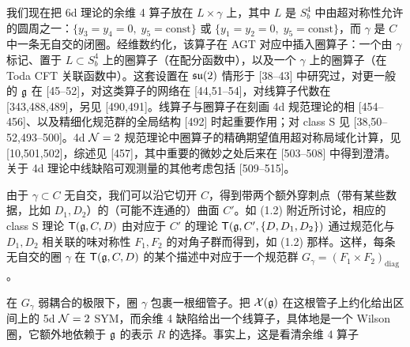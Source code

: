 我们现在把 6d 理论的余维 4 算子放在 $L\times\gamma$ 上，其中 $L$ 是 $S^4_b$ 中由超对称性允许的圆周之一：$\{y_3=y_4=0,\;y_5=\mathrm{const}\}$ 或 $\{y_1=y_2=0,\;y_5=\mathrm{const}\}$，而 $\gamma$ 是 $C$ 中一条无自交的闭圈。经维数约化，该算子在 AGT 对应中插入圈算子：一个由 $\gamma$ 标记、置于 $L\subset S^4_b$ 上的圈算子（在配分函数中），以及一个 $\gamma$ 上的圈算子（在 Toda CFT 关联函数中）。这套设置在 $\mathfrak{su}(2)$ 情形于 [38--43] 中研究过，对更一般的 $\mathfrak{g}$ 在 [45--52]，对这类算子的网络在 [44,51--54]，对线算子代数在 [343,488,489]，另见 [490,491]。线算子与圈算子在刻画 4d 规范理论的相 [454--456]、以及精细化规范群的全局结构 [492] 时起重要作用；对 class S 见 [38,50--52,493--500]。4d $\mathcal{N}=2$ 规范理论中圈算子的精确期望值用超对称局域化计算，见 [10,501,502]，综述见 [457]，其中重要的微妙之处后来在 [503--508] 中得到澄清。关于 4d 理论中线缺陷可观测量的其他考虑包括 [509--515]。

 由于 $\gamma\subset C$ 无自交，我们可以沿它切开 $C$，得到带两个额外穿刺点（带有某些数据，比如 $D_1,D_2$）的（可能不连通的）曲面 $C'$。如 (1.2) 附近所讨论，相应的 class S 理论 $\mathsf{T}(\mathfrak{g},C,D)$ 由对应于 $C'$ 的理论 $\mathsf{T}(\mathfrak{g},C',\{D,D_1,D_2\})$ 通过规范化与 $D_1,D_2$ 相关联的味对称性 $F_1,F_2$ 的对角子群而得到，如 (1.2) 那样。这样，每条无自交的圈 $\gamma$ 在 $\mathsf{T}(\mathfrak{g},C,D)$ 的某个描述中对应于一个规范群 $G_\gamma=(F_1\times F_2)_{\mathrm{diag}}$。

在 $G_\gamma$ 弱耦合的极限下，圈 $\gamma$ 包裹一根细管子。把 $\mathcal{X}(\mathfrak{g})$ 在这根管子上约化给出区间上的 5d $\mathcal{N}=2$ SYM，而余维 4 缺陷给出一个线算子，具体地是一个 Wilson 圈，它额外地依赖于 $\mathfrak{g}$ 的表示 $R$ 的选择。事实上，这是看清余维 4 算子
